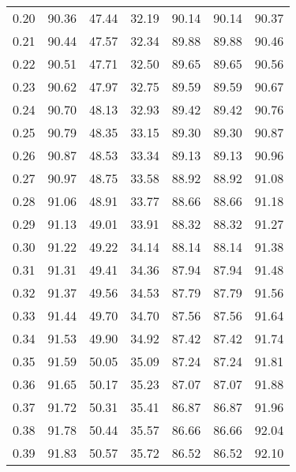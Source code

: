 \begin{tabular}{|c|c|c|c|c|c|c|}
      0.20 &     90.36 &     47.44 &      32.19 &   90.14 &      90.14 &         90.37 \\
      0.21 &     90.44 &     47.57 &      32.34 &   89.88 &      89.88 &         90.46 \\
      0.22 &     90.51 &     47.71 &      32.50 &   89.65 &      89.65 &         90.56 \\
      0.23 &     90.62 &     47.97 &      32.75 &   89.59 &      89.59 &         90.67 \\
      0.24 &     90.70 &     48.13 &      32.93 &   89.42 &      89.42 &         90.76 \\
      0.25 &     90.79 &     48.35 &      33.15 &   89.30 &      89.30 &         90.87 \\
      0.26 &     90.87 &     48.53 &      33.34 &   89.13 &      89.13 &         90.96 \\
      0.27 &     90.97 &     48.75 &      33.58 &   88.92 &      88.92 &         91.08 \\
      0.28 &     91.06 &     48.91 &      33.77 &   88.66 &      88.66 &         91.18 \\
      0.29 &     91.13 &     49.01 &      33.91 &   88.32 &      88.32 &         91.27 \\
      0.30 &     91.22 &     49.22 &      34.14 &   88.14 &      88.14 &         91.38 \\
      0.31 &     91.31 &     49.41 &      34.36 &   87.94 &      87.94 &         91.48 \\
      0.32 &     91.37 &     49.56 &      34.53 &   87.79 &      87.79 &         91.56 \\
      0.33 &     91.44 &     49.70 &      34.70 &   87.56 &      87.56 &         91.64 \\
      0.34 &     91.53 &     49.90 &      34.92 &   87.42 &      87.42 &         91.74 \\
      0.35 &     91.59 &     50.05 &      35.09 &   87.24 &      87.24 &         91.81 \\
      0.36 &     91.65 &     50.17 &      35.23 &   87.07 &      87.07 &         91.88 \\
      0.37 &     91.72 &     50.31 &      35.41 &   86.87 &      86.87 &         91.96 \\
      0.38 &     91.78 &     50.44 &      35.57 &   86.66 &      86.66 &         92.04 \\
      0.39 &     91.83 &     50.57 &      35.72 &   86.52 &      86.52 &         92.10 \\

\end{tabular}
